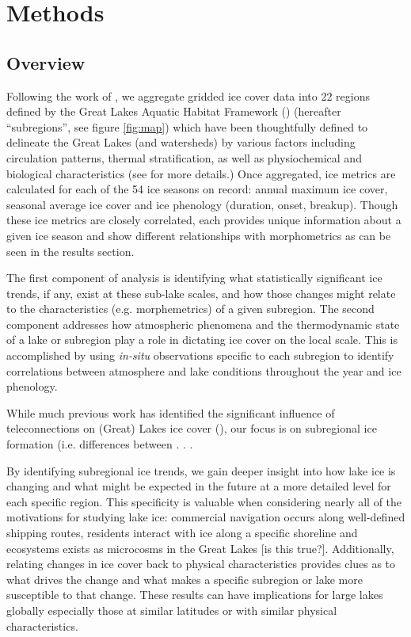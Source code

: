 \documentclass{article}
\begin{document}
\section{Methods}
\subsection{Overview}
Following the work of \textcite{Mason_2016}, we aggregate gridded ice cover data into 22 regions defined by the Great Lakes Aquatic Habitat Framework (\cite{Wang_2015}) (hereafter ``subregions'', see figure \ref{fig:map})  which have been thoughtfully defined to delineate the Great Lakes (and watersheds) by various factors including circulation patterns, thermal stratification, as well as physiochemical and biological characteristics (see \textcite{Wang_2015} for more details.) Once aggregated, ice metrics are calculated for each of the 54 ice seasons on record: annual maximum ice cover, seasonal average ice cover and ice phenology (duration, onset, breakup). Though these ice metrics are closely correlated, each provides unique information about a given ice season and show different relationships with morphometrics as can be seen in the results section. 

The first component of analysis is identifying what statistically significant ice trends, if any, exist at these sub-lake scales, and how those changes might relate to the characteristics (e.g. morphemetrics) of a given subregion. The second component addresses how atmospheric phenomena and the thermodynamic state of a lake or subregion play a role in dictating ice cover on the local scale. This is accomplished by using \emph{in-situ} observations specific to each subregion to identify correlations between atmosphere and lake conditions throughout the year and ice phenology. 

While much previous work has identified the significant influence of teleconnections on (Great) Lakes ice cover (\cite{Richardson_2024, Bai_2012, Wang_2018}), our focus is on subregional ice formation (i.e. differences between . . .

By identifying subregional ice trends, we gain deeper insight into how lake ice is changing and what might be expected in the future at a more detailed level for each specific region. This specificity is valuable when considering nearly all of the motivations for studying lake ice: commercial navigation occurs along well-defined shipping routes, residents interact with ice along a specific shoreline and ecosystems exists as microcosms in the Great Lakes [is this true?]. Additionally, relating changes in ice cover back to physical characteristics provides clues as to what drives the change and what makes a specific subregion or lake more susceptible to that change. These results can have implications for large lakes globally especially those at similar latitudes or with similar physical characteristics.
\end{document}
